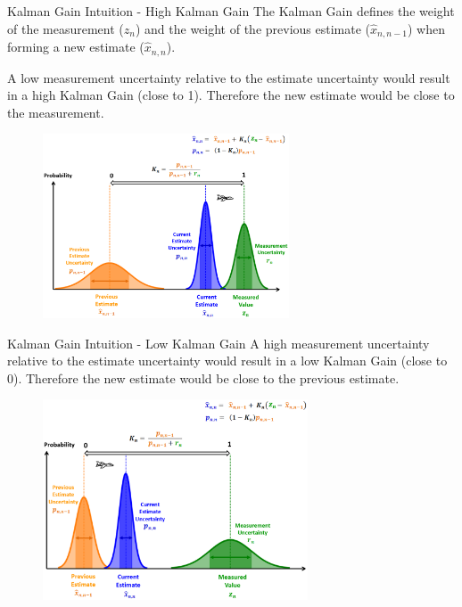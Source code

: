 \begin{frame}{Kalman Gain Intuition - High Kalman Gain}
The Kalman Gain defines the weight of the measurement ($z_n$) and the weight of the previous estimate ($\hat{x}_{n,n-1}$) when forming a new estimate ($\hat{x}_{n,n}$).

\vspace{5pt}
A low measurement uncertainty relative to the estimate uncertainty would result in a high Kalman Gain (close to 1). Therefore the new estimate would be close to the measurement.
    \begin{figure}
	   \centering \includegraphics[width=0.65\textwidth]{Figures/Chapter1/HighKalmanGain.png}
	   \label{fig:HighKalmanGain}
	   \vspace{-10pt}
	\end{figure}
\end{frame}
\begin{frame}{Kalman Gain Intuition - Low Kalman Gain}
A high measurement uncertainty relative to the estimate uncertainty would result in a low Kalman Gain (close to 0). Therefore the new estimate would be close to the previous estimate.
    \begin{figure}
	   \centering
   \includegraphics[width=0.7\textwidth]{Figures/Chapter1/LowKalmanGain.png}
	   \label{fig:LowKalmanGain}
	   \vspace{-10pt}
	\end{figure}
\end{frame}

